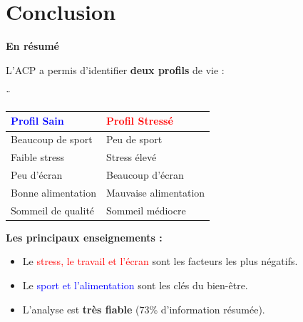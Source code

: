 \documentclass[12pt,a4paper]{book}
\begin{document}
	\chapter*{Conclusion}
	
	\vspace{0.5cm}
	
	\begin{center}
		\Large \textbf{En résumé}
	\end{center}
	
	\vspace{0.3cm}
	
	L'ACP a permis d'identifier \textbf{deux profils} de vie :
	
	\vspace{0.3cm}
	\newcommand{\ok}{\textcolor{green}{\ding{51}}}     %
	\newcommand{\ko}{\textcolor{red}{\ding{55}}}        %
	\newcommand{\warning}{\textcolor{orange}{\ding{43}}} %
	\newcommand{\info}{\textcolor{blue}{\ding{42}}} 
	¨
	\begin{table}[H]
		\centering
		\begin{tabular}{p{5cm}p{5cm}}
			\toprule
			\textcolor{blue}{\textbf{Profil Sain}} & \textcolor{red}{\textbf{Profil Stressé}} \\
			\midrule
			\ok Beaucoup de sport & \ko Peu de sport \\
			\ok Faible stress & \ko Stress élevé \\
			\ok Peu d'écran & \ko Beaucoup d'écran \\
			\ok Bonne alimentation & \ko Mauvaise alimentation \\
			\ok Sommeil de qualité & \ko Sommeil médiocre \\
			\bottomrule
		\end{tabular}
	\end{table}
	
	\vspace{0.3cm}
	
	\textbf{Les principaux enseignements :}
	
	\begin{itemize}
		\item Le \textcolor{red}{stress, le travail et l'écran} sont les facteurs les plus négatifs.
		\item Le \textcolor{blue}{sport et l'alimentation} sont les clés du bien-être.
		\item L'analyse est \textbf{très fiable} (73\% d'information résumée).
	\end{itemize}
	
\end{document}
